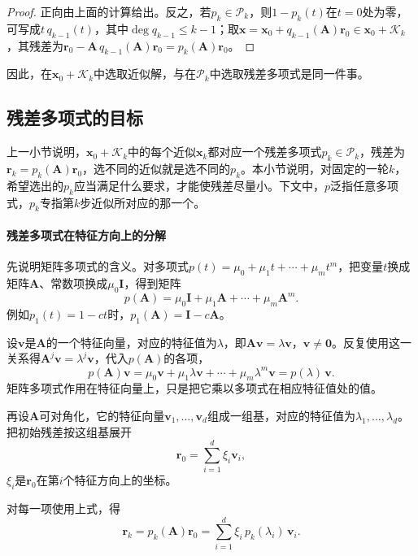 \begin{proof}
正向由上面的计算给出。反之，若$p_k\in\mathcal P_k$，则$1-p_k(t)$在$t=0$处为零，可写成$t\,q_{k-1}(t)$，其中$\deg q_{k-1}\le k-1$；取$\bm x=\bm x_0+q_{k-1}(\bm A)\bm r_0\in\bm x_0+\mathcal K_k$，其残差为$\bm r_0-\bm A\,q_{k-1}(\bm A)\bm r_0=p_k(\bm A)\bm r_0$。
\end{proof}
因此，在$\bm x_0+\mathcal K_k$中选取近似解，与在$\mathcal P_k$中选取残差多项式是同一件事。

\subsection{残差多项式的目标}

上一小节说明，$\bm x_0+\mathcal K_k$中的每个近似$\bm x_k$都对应一个残差多项式$p_k\in\mathcal P_k$，残差为$\bm r_k=p_k(\bm A)\bm r_0$，选不同的近似就是选不同的$p_k$。本小节说明，对固定的一轮$k$，希望选出的$p_k$应当满足什么要求，才能使残差尽量小。下文中，$p$泛指任意多项式，$p_k$专指第$k$步近似所对应的那一个。

\paragraph{残差多项式在特征方向上的分解}
先说明矩阵多项式的含义。对多项式$p(t)=\mu_0+\mu_1t+\cdots+\mu_mt^m$，把变量$t$换成矩阵$\bm A$、常数项换成$\mu_0\bm I$，得到矩阵
\[
  p(\bm A)=\mu_0\bm I+\mu_1\bm A+\cdots+\mu_m\bm A^m .
\]
例如$p_1(t)=1-ct$时，$p_1(\bm A)=\bm I-c\bm A$。

设$\bm v$是$\bm A$的一个特征向量，对应的特征值为$\lambda$，即$\bm A\bm v=\lambda\bm v$，$\bm v\ne\bm0$。反复使用这一关系得$\bm A^j\bm v=\lambda^j\bm v$，代入$p(\bm A)$的各项，
\begin{equation}
 p(\bm A)\bm v=\mu_0\bm v+\mu_1\lambda\bm v+\cdots+\mu_m\lambda^m\bm v=p(\lambda)\,\bm v .
 \label{eq:ls-krylov-polynomial-eigenvector}
\end{equation}
矩阵多项式作用在特征向量上，只是把它乘以多项式在相应特征值处的值。

再设$\bm A$可对角化，它的特征向量$\bm v_1,\ldots,\bm v_d$组成一组基，对应的特征值为$\lambda_1,\ldots,\lambda_d$。把初始残差按这组基展开
\[
  \bm r_0=\sum_{i=1}^d\xi_i\bm v_i ,
\]
$\xi_i$是$\bm r_0$在第$i$个特征方向上的坐标。

对每一项使用上式，得
\begin{equation}
 \bm r_k=p_k(\bm A)\bm r_0=\sum_{i=1}^d\xi_i\,p_k(\lambda_i)\,\bm v_i .
 \label{eq:ls-krylov-residual-eigen-expansion}
\end{equation}

